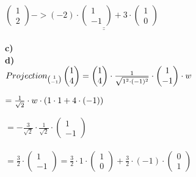 \documentclass[11pt]{amsart}
\begin{document}
$\begin{pmatrix} 1 \\ 2 \end{pmatrix} -> 
 \underline{\underline{(-2) \cdot \begin{pmatrix} 1 \\ -1 \end{pmatrix} + 3 \cdot \begin{pmatrix} 1 \\ 0 \end{pmatrix}}}$ \\\\
 
 \textbf{c)}\\
 
 
 
 
 
 \textbf{d)}\\

$Projection_{\binom{1}{-1}} \begin{pmatrix} 1 \\ 4 \end{pmatrix} = \begin{pmatrix} 1 \\ 4 \end{pmatrix} \cdot \frac{1}{\sqrt{1^2\cdot(-1)^2}} \cdot \begin{pmatrix} 1 \\ -1 \end{pmatrix} 
 \cdot w \\\\$  
 
$  = \frac{1}{\sqrt{2}} \cdot w \cdot (1\cdot1+4\cdot(-1)) \\\\$ 

$= -\frac{3}{\sqrt{2}} \cdot \frac{1}{\sqrt{2}} \cdot \begin{pmatrix} 1 \\ -1 \end{pmatrix} $ \\\\

$ = \frac{3}{2} \cdot \begin{pmatrix} 1 \\ -1 \end{pmatrix} = \frac{3}{2} \cdot 1 \cdot 
	\begin{pmatrix} 1 \\ 0 \end{pmatrix} + \frac{3}{2} \cdot (-1) \cdot 
	\begin{pmatrix} 0 \\ 1 \end{pmatrix} $
 
\end{document}
